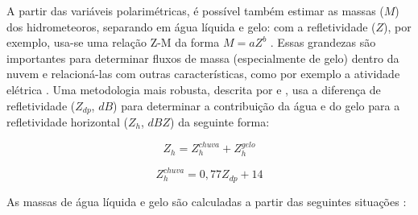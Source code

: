 A partir das variáveis polarimétricas, é possível também estimar as massas ($M$) dos hidrometeoros, separando em água líquida e gelo: com a refletividade ($Z$), por exemplo, usa-se uma relação Z-M da forma $M=aZ^b$ \cite{Sassen1987}. Essas grandezas são importantes para determinar fluxos de massa (especialmente de gelo) dentro da nuvem e relacioná-las com outras características, como por exemplo a atividade elétrica \cite{Deierling2005, Deierling2008}. Uma metodologia mais robusta, descrita por  e , usa a diferença de refletividade ($Z_{dp}$, $dB$) \cite{Golestani1989} para determinar a contribuição da água e do gelo para a refletividade horizontal ($Z_h$, $dBZ$) da seguinte forma:

\begin{equation}
	Z_h=Z_h^{chuva} + Z_h^{gelo}
\end{equation}

\begin{equation}
	Z_h^{chuva}=0,77Z_{dp}+14
\end{equation}

As massas de água líquida e gelo são calculadas a partir das seguintes situações \cite{Cifelli2002b}:

